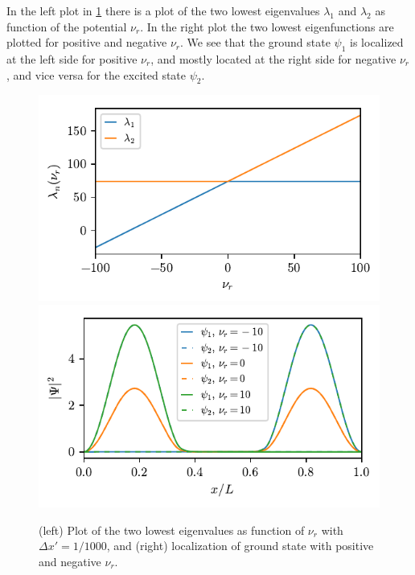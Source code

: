 In the left plot in \cref{fig:detuning1} there is a plot of the two lowest eigenvalues $\lambda_1$ and $\lambda_2$ as function of the potential $\nu_r$. In the right plot the two lowest eigenfunctions are plotted for positive and negative $\nu_r$. We see that the ground state $\psi_1$ is localized at the left side for positive $\nu_r$, and mostly located at the right side for negative $\nu_r$, and vice versa for the excited state $\psi_2$.
\begin{figure}[ht!]%
\centering%
\includegraphics{figs/detuning_4_1.pdf}%
\includegraphics{figs/detuning_localization.pdf}%
\caption{(left) Plot of the two lowest eigenvalues as function of $\nu_r$ with $\Delta x' = 1/1000$, and (right) localization of ground state with positive and negative $\nu_r$. \label{fig:detuning1}}%
\end{figure}